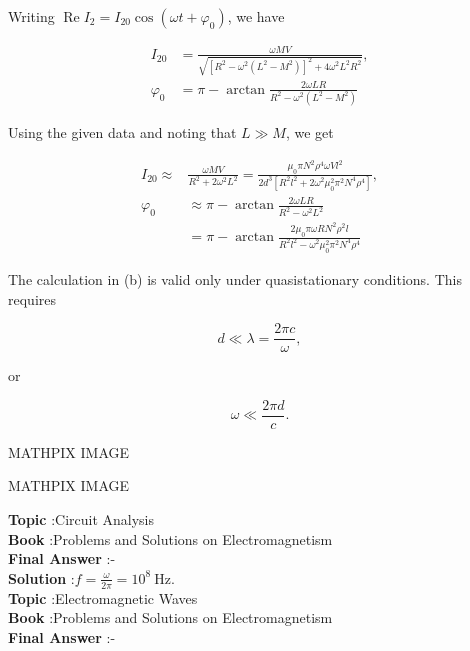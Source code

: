 \documentclass[10pt]{article}
\begin{document}
Writing $\operatorname{Re} I_{2}=I_{20} \cos \left(\omega t+\varphi_{0}\right)$, we have

$$
\begin{aligned}
I_{20} &=\frac{\omega M V}{\sqrt{\left[R^{2}-\omega^{2}\left(L^{2}-M^{2}\right)\right]^{2}+4 \omega^{2} L^{2} R^{2}}}, \\
\varphi_{0} &=\pi-\arctan \frac{2 \omega L R}{R^{2}-\omega^{2}\left(L^{2}-M^{2}\right)}
\end{aligned}
$$

Using the given data and noting that $L \gg M$, we get

$$
\begin{aligned}
I_{20} \approx & \frac{\omega M V}{R^{2}+2 \omega^{2} L^{2}}=\frac{\mu_{0} \pi N^{2} \rho^{4} \omega V l^{2}}{2 d^{3}\left[R^{2} l^{2}+2 \omega^{2} \mu_{0}^{2} \pi^{2} N^{4} \rho^{4}\right]}, \\
\varphi_{0} & \approx \pi-\arctan \frac{2 \omega L R}{R^{2}-\omega^{2} L^{2}} \\
&=\pi-\arctan \frac{2 \mu_{0} \pi \omega R N^{2} \rho^{2} l}{R^{2} l^{2}-\omega^{2} \mu_{0}^{2} \pi^{2} N^{4} \rho^{4}}
\end{aligned}
$$

 The calculation in (b) is valid only under quasistationary conditions. This requires

$$
d \ll \lambda=\frac{2 \pi c}{\omega},
$$

or

$$
\omega \ll \frac{2 \pi d}{c} .
$$



MATHPIX IMAGE







MATHPIX IMAGE




\textbf{Topic} :Circuit Analysis\\
\textbf{Book} :Problems and Solutions on Electromagnetism\\
\textbf{Final Answer} :\pi-\arctan {}\\


\textbf{Solution} :$f=\frac{\omega}{2 \pi}=10^{8} \mathrm{~Hz}$.
\\
\textbf{Topic} :Electromagnetic Waves\\
\textbf{Book} :Problems and Solutions on Electromagnetism\\
\textbf{Final Answer} :\pi-\arctan {}\\
\end{document}
